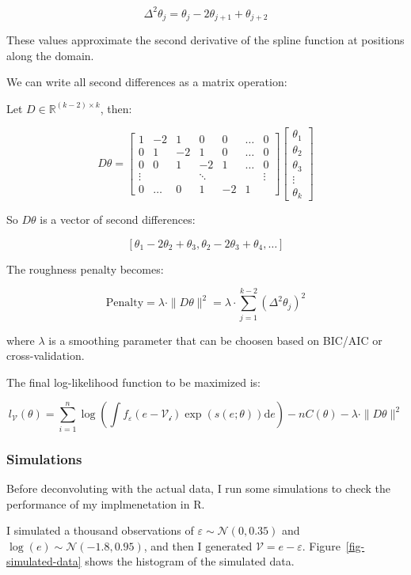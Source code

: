 \documentclass[
  12pt]{article}
\theoremstyle{definition}
\theoremstyle{remark}
\begin{document}
\[
\Delta^2 \theta_j = \theta_j - 2\theta_{j+1} + \theta_{j+2}
\]

These values approximate the second derivative of the spline function at
positions along the domain.

We can write all second differences as a matrix operation:

Let \(D \in \mathbb{R}^{(k-2) \times k}\), then:

\[
D \theta = 
\begin{bmatrix}
1 & -2 & 1 & 0 & 0 & \dots & 0 \\
0 & 1 & -2 & 1 & 0 & \dots & 0 \\
0 & 0 & 1 & -2 & 1 & \dots & 0 \\
\vdots & & & \ddots & & & \vdots \\
0 & \dots & 0 & 1 & -2 & 1
\end{bmatrix}
\begin{bmatrix}
\theta_1 \\
\theta_2 \\
\theta_3 \\
\vdots \\
\theta_k
\end{bmatrix}
\]

So \(D \theta\) is a vector of second differences:

\[
\left[ \theta_1 - 2\theta_2 + \theta_3, \theta_2 - 2\theta_3 + \theta_4, \dots \right]
\]

The roughness penalty becomes:

\[
\text{Penalty} = \lambda \cdot \| D \theta \|^2 = \lambda \cdot \sum_{j=1}^{k-2} (\Delta^2 \theta_j)^2
\]

where \(\lambda\) is a smoothing parameter that can be choosen based on
BIC/AIC or cross-validation.

The final log-likelihood function to be maximized is:

\[
l_{\mathcal{V}}(\theta) = \sum_{i=1}^{n}\log \left(\int f_{\varepsilon}(e-\mathcal{V_i})\exp(s(e;\theta))\text{d}e\right)-nC(\theta) - \lambda \cdot \| D \theta \|^2
\]

\subsubsection{Simulations}\label{simulations}

Before deconvoluting with the actual data, I run some simulations to
check the performance of my implmenetation in R.

I simulated a thousand observations of
\(\varepsilon \sim \mathcal{N}(0,0.35)\) and
\(\log(e) \sim \mathcal{N}(-1.8,0.95)\), and then I generated
\(\mathcal{V} = e - \varepsilon\). Figure~\ref{fig-simulated-data} shows
the histogram of the simulated data.
\end{document}
